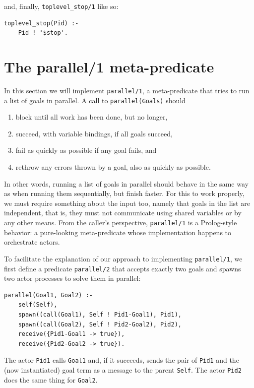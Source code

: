 \noindent and, finally, \texttt{toplevel\_stop/1} like so:

\begin{verbatim}
toplevel_stop(Pid) :-
    Pid ! '$stop'.
\end{verbatim}    

\section{The parallel/1 meta-predicate}

In this section we will implement \texttt{parallel/1}, a meta-predicate that tries to run a list of goals in parallel. A call to \texttt{parallel(Goals)} should

\begin{enumerate}
\item block until all work has been done, but no longer,
\item succeed, with variable bindings, if all goals succeed,
\item fail as quickly as possible if any goal fails, and 
\item rethrow any errors thrown by a goal, also as quickly as possible.
\end{enumerate}

\noindent In other words, running a list of goals in parallel should behave in the same way as when running them sequentially, but finish faster. For this to work properly, we must require something about the input too, namely that goals in the list are independent, that is, they must not communicate using shared variables or by any other means. From the caller's perspective, \texttt{parallel/1} is a Prolog-style behavior: a pure-looking meta-predicate whose implementation happens to orchestrate actors.

To facilitate the explanation of our approach to implementing \texttt{parallel/1}, we first define a predicate \texttt{parallel/2} that accepts exactly two goals and spawns two actor processes to solve them in parallel:

\begin{verbatim}
parallel(Goal1, Goal2) :-
    self(Self),
    spawn((call(Goal1), Self ! Pid1-Goal1), Pid1),
    spawn((call(Goal2), Self ! Pid2-Goal2), Pid2),        
    receive({Pid1-Goal1 -> true}),
    receive({Pid2-Goal2 -> true}).    
\end{verbatim}

\noindent The actor \texttt{Pid1} calls \texttt{Goal1} and, if it succeeds, sends the pair of \texttt{Pid1} and the (now instantiated) goal term as a message to the parent \texttt{Self}. The actor \texttt{Pid2} does the same thing for \texttt{Goal2}.

